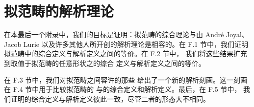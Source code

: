\chapter{拟范畴的解析理论}\label{ch:analytic-theory-of-quasi-categories}


在本最后一个附录中，我们的目标是证明：拟范畴的综合理论与由 André Joyal、%
Jacob Lurie 以及许多其他人所开创的解析理论是相容的。在 F.1 节中，我们证明%
拟范畴中\trTerminal{}\trElement{}的综合定义与解析定义之间的等价。在 F.2 节中，%
我们将这些结果扩充到取值于拟范畴的任意形状\trDiagram{}之\trLimit{}的综合%
定义与解析定义之间的等价。

在 F.3 节中，我们对拟范畴之间容许\trRightAdjoint\trRightInverse{}的那些%
\trIsofibration{}给出了一个新的解析刻画。这一刻画在 F.4 节中用于比较拟范畴的%
\trCartesianFibration{}与\trCartesianArrow{}的综合定义和解析定义。最后，在 F.5 节中，%
我们证明\trAdjunction{}的综合定义与解析定义彼此一致，尽管二者的形态大不相同。

